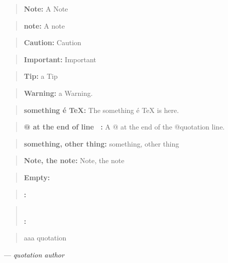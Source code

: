 \documentclass{book}
\begin{document}
\begin{quote}
\textbf{Note:} A Note
\end{quote}

\begin{quote}
\textbf{note:} A note
\end{quote}

\begin{quote}
\textbf{Caution:} Caution
\end{quote}

\begin{quote}
\textbf{Important:} Important
\end{quote}

\begin{quote}
\textbf{Tip:} a Tip
\end{quote}

\begin{quote}
\textbf{Warning:} a Warning.
\end{quote}

\begin{quote}
\textbf{something \'{e} \TeX{}:} The something \'{e} \TeX{} is here.
\end{quote}

\begin{quote}
\textbf{@ at the end of line \ {}:} A @ at the end of the @quotation line.
\end{quote}

\begin{quote}
\textbf{something, other thing:} something, other thing
\end{quote}

\begin{quote}
\textbf{Note, the note:} Note, the note
\end{quote}

\begin{quote}
\end{quote}

\begin{quote}
\textbf{Empty:} \end{quote}

\begin{quote}
\textbf{:} \end{quote}

\begin{quote}
\textbf{\leavevmode{}\\:} \end{quote}

\begin{quote}
aaa quotation
\end{quote}
\begin{center}
--- \emph{quotation author}
\end{center}
\end{document}
